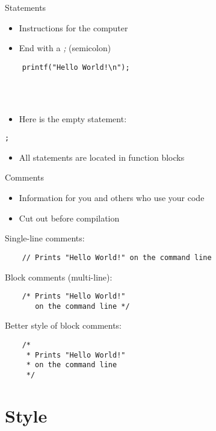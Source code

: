 \begin{frame}[fragile = singleslide]{Statements}
	\begin{itemize}
		\item Instructions for the computer
		\item End with a \textit{;} (semicolon)
	\end{itemize}
	\begin{lstlisting}
	printf("Hello World!\n");
\end{lstlisting} \ \\ \ \\
	\begin{itemize}
		\item Here is the empty statement:
	\end{itemize}
	\begin{lstlisting}[numbers=none]
	;
\end{lstlisting}
	\begin{itemize}
		\item All statements are located in function blocks
	\end{itemize}
\end{frame}

\begin{frame}[fragile = singleslide]{Comments}
	\begin{itemize}
		\item Information for you and others who use your code
		\item Cut out before compilation
	\end{itemize}
	Single-line comments:
	\begin{lstlisting}
	// Prints "Hello World!" on the command line
\end{lstlisting}
	Block comments (multi-line):
	\begin{lstlisting}
	/* Prints "Hello World!"
	   on the command line */
\end{lstlisting}
	Better style of block comments:
	\begin{lstlisting}
	/*
	 * Prints "Hello World!"
	 * on the command line
	 */
\end{lstlisting}
\end{frame}
\section{Style}
